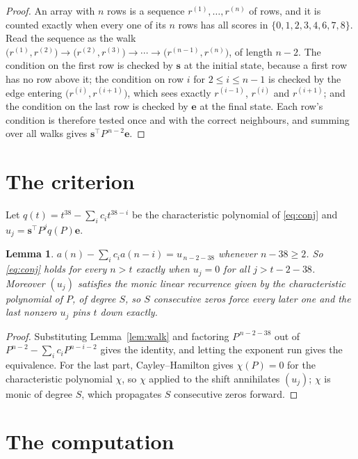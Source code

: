 \documentclass[11pt,a4paper]{article}
\theoremstyle{plain}
\newtheorem{lemma}[theorem]{Lemma}
\theoremstyle{definition}
\begin{document}
\begin{proof}
An array with $n$ rows is a sequence $r^{(1)},\dots,r^{(n)}$ of rows, and it is counted
exactly when every one of its $n$ rows has all scores in $\{0,1,2,3,4,6,7,8\}$. Read the sequence as the
walk $\bigl(r^{(1)},r^{(2)}\bigr)\to\bigl(r^{(2)},r^{(3)}\bigr)\to\cdots\to
\bigl(r^{(n-1)},r^{(n)}\bigr)$, of length $n-2$. The condition on the first row is
checked by $\mathbf{s}$ at the initial state, because a first row has no row above it; the
condition on row $i$ for $2\le i\le n-1$ is checked by the edge entering
$\bigl(r^{(i)},r^{(i+1)}\bigr)$, which sees exactly $r^{(i-1)}$, $r^{(i)}$ and
$r^{(i+1)}$; and the condition on the last row is checked by $\mathbf{e}$ at the final
state. Each row's condition is therefore tested once and with the correct neighbours, and
summing over all walks gives $\mathbf{s}^{\!\top}P^{\,n-2}\mathbf{e}$.
\end{proof}

\section{The criterion}

Let $q(t)=t^{38}-\sum_i c_i t^{38-i}$ be the characteristic polynomial of
\eqref{eq:conj} and $u_j=\mathbf{s}^{\!\top}P^{j}q(P)\mathbf{e}$.

\begin{lemma}\label{lem:crit}
$a(n)-\sum_i c_i a(n-i)=u_{\,n-2-38}$ whenever $n-38\ge2$. So \eqref{eq:conj}
holds for every $n>t$ exactly when $u_j=0$ for all $j>t-2-38$. Moreover $(u_j)$
satisfies the monic linear recurrence given by the characteristic polynomial of $P$, of
degree $S$, so $S$ consecutive zeros force every later one and the last nonzero $u_j$ pins
$t$ down exactly.
\end{lemma}

\begin{proof}
Substituting Lemma~\ref{lem:walk} and factoring $P^{\,n-2-38}$ out of
$P^{n-2}-\sum_i c_i P^{n-i-2}$ gives the identity, and letting the exponent run gives the
equivalence. For the last part, Cayley--Hamilton gives $\chi(P)=0$ for the characteristic
polynomial $\chi$, so $\chi$ applied to the shift annihilates $(u_j)$; $\chi$ is monic of
degree $S$, which propagates $S$ consecutive zeros forward.
\end{proof}

\section{The computation}
\end{document}
